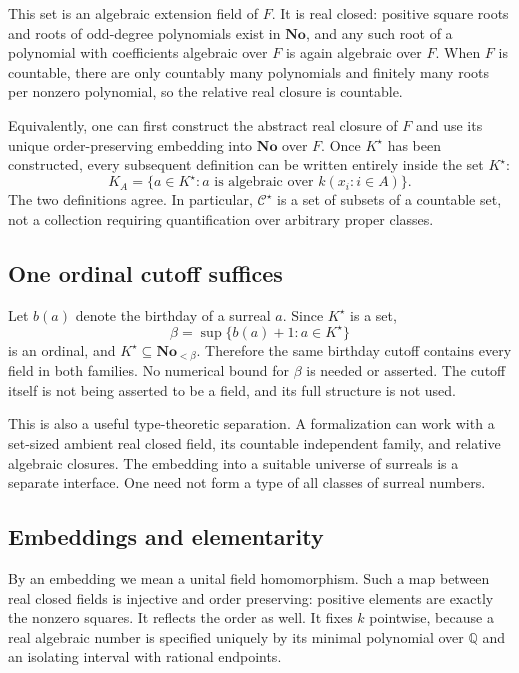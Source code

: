 \documentclass[11pt,a4paper]{article}
\numberwithin{equation}{section}
\theoremstyle{definition}
\theoremstyle{remark}
\newcommand{\Q}{\mathbb Q}
\newcommand{\No}{\mathbf{No}}
\newcommand{\Cstar}{\mathcal C^{\star}}
\newcommand{\Kstar}{K^{\star}}
\begin{document}
This set is an algebraic extension field of $F$. It is real closed: positive
square roots and roots of odd-degree polynomials exist in $\No$, and any
such root of a polynomial with coefficients algebraic over $F$ is again
algebraic over $F$. When $F$ is countable, there are only countably many
polynomials and finitely many roots per nonzero polynomial, so the relative
real closure is countable.

Equivalently, one can first construct the abstract real closure of $F$ and
use its unique order-preserving embedding into $\No$ over $F$. Once
$\Kstar$ has been constructed, every subsequent definition can be written
entirely inside the set $\Kstar$:
\begin{equation}
 K_A=\{a\in\Kstar:a\text{ is algebraic over }k(x_i:i\in A)\}.
 \label{csf:eq:set-relative}
\end{equation}
The two definitions agree. In particular, $\Cstar$ is a set of subsets of a
countable set, not a collection requiring quantification over arbitrary
proper classes.

\subsection{One ordinal cutoff suffices}

Let $b(a)$ denote the birthday of a surreal $a$. Since $\Kstar$ is a set,
\[
 \beta=\sup\{b(a)+1:a\in\Kstar\}
\]
is an ordinal, and $\Kstar\subseteq\No_{<\beta}$. Therefore the same birthday
cutoff contains every field in both families. No numerical bound for
$\beta$ is needed or asserted. The cutoff itself is not being asserted to
be a field, and its full structure is not used.

This is also a useful type-theoretic separation. A formalization can work
with a set-sized ambient real closed field, its countable independent family,
and relative algebraic closures. The embedding into a suitable universe of
surreals is a separate interface. One need not form a type of all classes
of surreal numbers.

\subsection{Embeddings and elementarity}

By an embedding we mean a unital field homomorphism. Such a map between real
closed fields is injective and order preserving: positive elements are
exactly the nonzero squares. It reflects the order as well. It fixes $k$
pointwise, because a real algebraic number is specified uniquely by its
minimal polynomial over $\Q$ and an isolating interval with rational
endpoints.
\end{document}
